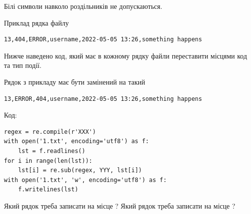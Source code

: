 \documentclass[12pt, ukrainian]{article}
\begin{document}
{Білі символи навколо роздільників не допускаються.

Приклад рядка файлу



\begin{verbatim}
13,404,ERROR,username,2022-05-05 13:26,something happens
\end{verbatim}


Нижче наведено код, який має в кожному рядку файли переставити місцями код та тип події.

Рядок з прикладу має бути замінений на такий



\begin{verbatim}
13,ERROR,404,username,2022-05-05 13:26,something happens
\end{verbatim}




Код:



\begin{verbatim}
regex = re.compile(r'XXX')
with open('1.txt', encoding='utf8') as f:
    lst = f.readlines()
for i in range(len(lst)):
    lst[i] = re.sub(regex, YYY, lst[i])
with open('1.txt', 'w', encoding='utf8') as f:
    f.writelines(lst)
\end{verbatim}





Який рядок треба записати на місце  ?
Який рядок треба записати на місце  ?\par

}
\newpage
\end{document}
